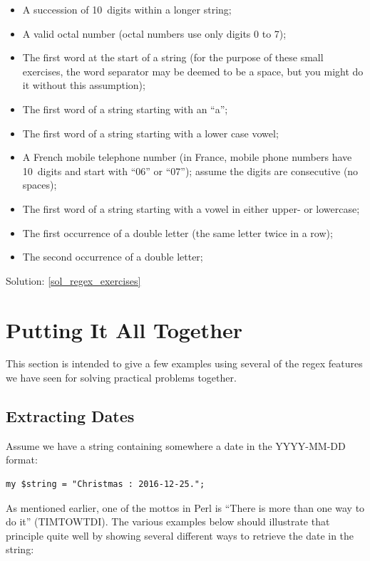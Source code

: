 \begin{itemize}
\item A succession of 10~digits within a longer string;
\item A valid octal number (octal numbers use only 
digits 0 to 7);
\item The first word at the start of a string (for the 
purpose of these small exercises, the word 
separator may be deemed to be a space, but you might do 
it without this assumption);
\item The first word of a string starting with an ``a'';
\item The first word of a string starting with a lower case vowel;
\item A French mobile telephone number (in France, mobile 
phone numbers have 10~digits and start with ``06'' or ``07''); 
assume the digits are consecutive (no spaces);
\item The first word of a string starting with a vowel in 
either upper- or lowercase;
\item The first occurrence of a double letter (the
same letter twice in a row);
\item The second occurrence of a double letter;
 
\end{itemize}

Solution: \ref{sol_regex_exercises}
 

\section{Putting It All Together}

This section is intended to give a few examples using 
several of the regex features we have seen for solving practical 
problems together.

\subsection{Extracting Dates}
\label{extracting_dates}

Assume we have a string containing somewhere a 
date in the YYYY-MM-DD format:

\begin{verbatim}
my $string = "Christmas : 2016-12-25.";
\end{verbatim}
%

As mentioned earlier, one of the mottos in Perl is ``There 
is more than one way to do it'' (TIMTOWTDI). The various 
examples below should illustrate that principle quite well 
by showing several different ways to retrieve the date in 
the string:


